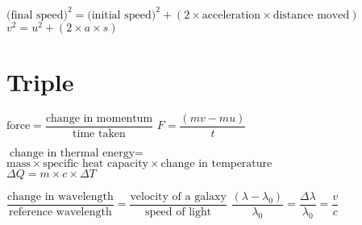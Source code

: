 \documentclass[12pt,a4paper]{article}
\begin{document}
\vspace{0.5em}

\noindent\begin{paracol}{2}
$\text{(final speed)}^{2}=\text{(initial speed)}^{2}+(2\times \text{acceleration}\times \text{distance moved})$
\switchcolumn
$v^{2}=u^{2}+(2\times a\times s)$\\
\end{paracol}

\section*{Triple}


\noindent\begin{paracol}{2}
$\text{force}=\dfrac{\text{change in momentum}}{\text{time taken}}$
\switchcolumn
$F=\dfrac{(mv-mu)}{t}$\\
\end{paracol}

\vspace{0.5em}

\noindent\begin{paracol}{2}
$\text{change in thermal energy}=$\\
\hspace*{1.5cm}$\text{mass}\times\text{specific heat capacity}\times\text{change in temperature}$\\
\switchcolumn
$\Delta Q=m\times c\times\Delta T$\\
\end{paracol}

\vspace{0.5em}

\noindent\begin{paracol}{2}
$\dfrac{\text{change in wavelength}}{\text{reference wavelength}}=\dfrac{\text{velocity of a galaxy}}{\text{speed of light}}$
\switchcolumn
$\dfrac{(\lambda-\lambda_{0})}{\lambda_{0}}=\dfrac{\Delta\lambda}{\lambda_{0}}=\dfrac{v}{c}$\\
\end{paracol}


\thispagestyle{empty}

\vfill{}
\ccbyncsa
\end{document}
